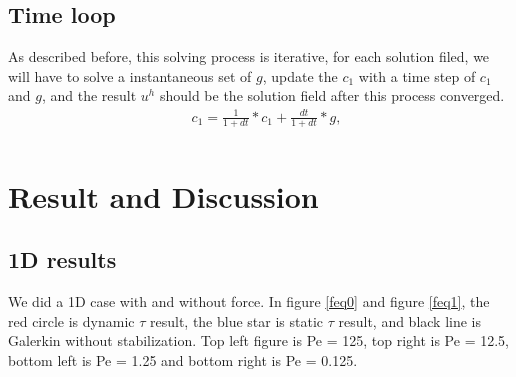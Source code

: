 \documentclass[10pt]{article}
\begin{document}
\subsection{Time loop}
As described before, this solving process is iterative, for each solution filed, we will have to solve a instantaneous set of $g$, update the $c_{1}$ with a time step of $c_{1}$ and  $g$, and the result $u^{h}$ should be the solution field after this process converged. \\
\begin{equation}
    \begin{aligned}
       \quad c_{1}  = \frac{1}{1+dt}*c_{1}+\frac{dt}{1+dt}*g,   \\
    \end{aligned}\label{eq:23} 
\end{equation}

\section{Result and Discussion}

\subsection{1D results}
We did a 1D case with and without force. In figure \ref{feq0} and figure \ref{feq1}, the red circle is dynamic  $\tau$ result, the blue star is static $\tau$ result, and black line is Galerkin without stabilization. Top left figure is Pe = 125, top right is Pe = 12.5, bottom left is Pe = 1.25 and bottom right is Pe = 0.125.
\end{document}
